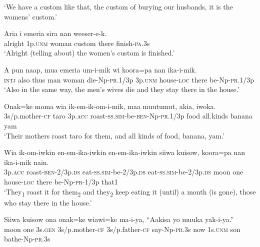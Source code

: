 \glt ‘We have a custom like that, the custom of burying our husbands, it is the womens’ custom.’ \\
\z


\ea
\gll  Aria  i  emeria  sira  nan  weeser-e-k. \\
alright  1p.\textsc{unm}  woman  custom  there  finish-\textsc{pa}.3s \\
\glt ‘Alright (telling about) the women’s custom is finished.’ \\
\z


\ea
\gll  A  pun  naap,  mua  emeria  um-i-mik  wi  koora=pa  nan          ika-i-mik. \\
\textsc{intj}  also  thus  man  woman  die-Np-\textsc{pr}.1/3p  3p.\textsc{unm}  house-\textsc{loc}  there be-Np-\textsc{pr}.1/3p \\


\glt ‘Also in the same way, the men’s wives die and they stay there in the house.’ \\
\z


\ea
\gll  Onak=ke  moma  wia  ik-em-ik-om-i-mik,  maa                   muutumut,  akia,  iwoka. \\
3s/p.mother-\textsc{cf}  taro  3p.\textsc{acc}  roast-\textsc{ss}.\textsc{sim}-be-\textsc{ben}-Np-\textsc{pr}.1/3p  food  all.kinds  banana  yam \\


\glt ‘Their mothers roast taro for them, and all kinds of food, banana, yam.’ \\
\z


\ea
\gll  Wia  ik-om-iwkin  en-em-ika-iwkin  en-em-ika-iwkin                siiwa  kuisow,  koora=pa  nan  ika-i-mik  nain. \\
3p.\textsc{acc}  roast-\textsc{ben}-2/3p.\textsc{ds}  eat-\textsc{ss}.\textsc{sim}-be-2/3p.\textsc{ds}  eat-\textsc{ss}.\textsc{sim}-be-2/3p.\textsc{ds} moon  one  house-\textsc{loc}  there  be-Np-\textsc{pr}-1/3p  that1 \\


\glt ‘They\textsubscript{1} roast it for them\textsubscript{2 }and they\textsubscript{2} keep eating it (until) a month (is gone), those who stay there in the house.’ \\
\z


\ea
\gll  Siiwa  kuisow  ona  onak=ke  wiawi=ke  ma-i-ya,  “Aakisa        yo  muuka  yak-i-ya.” \\
moon  one  3s.\textsc{gen}  3s/p.mother-\textsc{cf}  3s/p.father-\textsc{cf}  say-Np-\textsc{pr}.3s  now  1s.\textsc{unm}  son  bathe-Np-\textsc{pr}.3s \\


